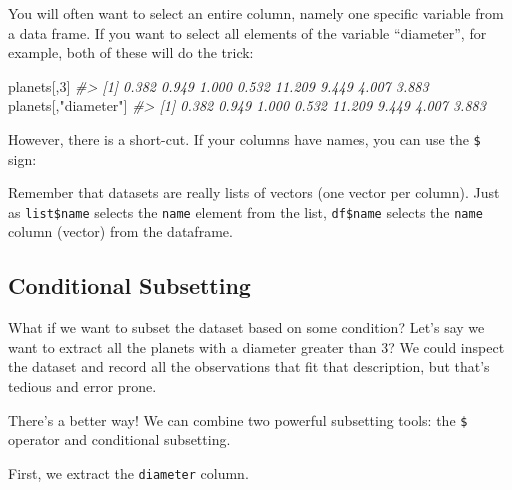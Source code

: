 \documentclass[]{book}
\newenvironment{Shaded}{\begin{snugshade}}{\end{snugshade}}
\newcommand{\DecValTok}[1]{\textcolor[rgb]{0.00,0.00,0.81}{#1}}
\newcommand{\StringTok}[1]{\textcolor[rgb]{0.31,0.60,0.02}{#1}}
\newcommand{\CommentTok}[1]{\textcolor[rgb]{0.56,0.35,0.01}{\textit{#1}}}
\newcommand{\OperatorTok}[1]{\textcolor[rgb]{0.81,0.36,0.00}{\textbf{#1}}}
\newcommand{\NormalTok}[1]{#1}
\begin{document}
You will often want to select an entire column, namely one specific
variable from a data frame. If you want to select all elements of the
variable ``diameter'', for example, both of these will do the trick:

\begin{Shaded}
\begin{Highlighting}[]
\NormalTok{planets[,}\DecValTok{3}\NormalTok{]}
\CommentTok{#> [1]  0.382  0.949  1.000  0.532 11.209  9.449  4.007  3.883}
\NormalTok{planets[,}\StringTok{"diameter"}\NormalTok{]}
\CommentTok{#> [1]  0.382  0.949  1.000  0.532 11.209  9.449  4.007  3.883}
\end{Highlighting}
\end{Shaded}

However, there is a short-cut. If your columns have names, you can use
the \texttt{\$} sign:

\begin{Shaded}
\end{Shaded}

Remember that datasets are really lists of vectors (one vector per
column). Just as \texttt{list\$name} selects the \texttt{name} element
from the list, \texttt{df\$name} selects the \texttt{name} column
(vector) from the dataframe.

\subsection{Conditional Subsetting}\label{conditional-subsetting-1}

What if we want to subset the dataset based on some condition? Let's say
we want to extract all the planets with a diameter greater than 3? We
could inspect the dataset and record all the observations that fit that
description, but that's tedious and error prone.

There's a better way! We can combine two powerful subsetting tools: the
\texttt{\$} operator and conditional subsetting.

First, we extract the \texttt{diameter} column.

\begin{Shaded}
\end{Shaded}
\end{document}
